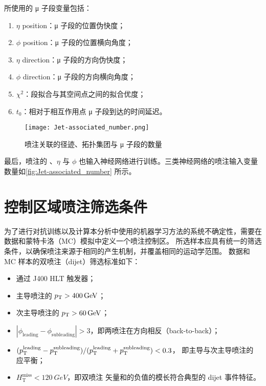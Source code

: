 所使用的 μ 子段变量包括：
\begin{enumerate}
      \item $\eta$ position：μ 子段的位置伪快度；
      \item $\phi$ position：μ 子段的位置横向角度；
      \item $\eta$ direction：μ 子段的方向伪快度；
      \item $\phi$ direction：μ 子段的方向横向角度；
      \item $\chi^2$：段拟合与其空间点之间的拟合优度；
      \item $t_0$：相对于相互作用点 μ 子段到达的时间延迟。
\end{enumerate}

\begin{figure}[ht]
      \centering
      \texttt{[image: Jet-associated\_number.png]}
      \caption{喷注关联的径迹、拓扑集团与 μ 子段的数量}
      \label{fig:Jet-associated_number}
\end{figure}

最后，喷注的 \pt、$\eta$ 与 $\phi$ 也输入神经网络进行训练。三类神经网络的喷注输入变量数量如\autoref{fig:Jet-associated_number} 所示。


\section{控制区域喷注筛选条件}
\label{cpm:CR_jet_selection}

为了进行对抗训练以及计算本分析中使用的机器学习方法的系统不确定性，需要在数据和蒙特卡洛（MC）模拟中定义一个喷注控制区。
所选样本应具有统一的筛选条件，以确保喷注来源于相同的产生机制，并覆盖相同的运动学范围。
数据和 MC 样本的双喷注（dijet）筛选标准如下：
\begin{itemize}
      \item 通过 J400 HLT 触发器；
      \item 主导喷注的 $p_{\text{T}} > \SI{400}{GeV}$；
      \item 次主导喷注的 $p_{\text{T}} > \SI{60}{GeV}$；
      \item $|\phi_{\text{leading}} - \phi_{\text{subleading}}| > 3$，即两喷注在方向相反（back-to-back）；
      \item $(p_{\text{T}}^{\text{leading}} - p_{\text{T}}^{\text{subleading}}) / (p_{\text{T}}^{\text{leading}} + p_{\text{T}}^{\text{subleading}}) < 0.3$，
            即主导与次主导喷注的 \pt 应平衡；
      \item $H_\text{T}^\text{miss} < \SI{120}{GeV}$，即双喷注 \pt 矢量和的负值的模长符合典型的 dijet 事件特征。
\end{itemize}

